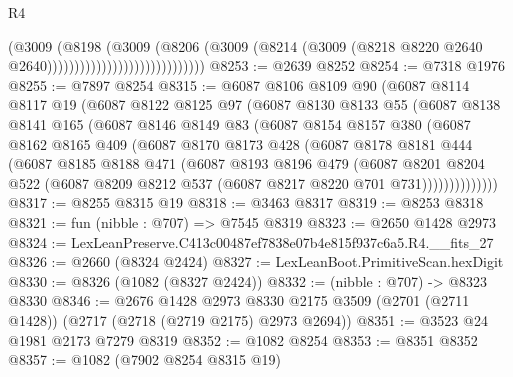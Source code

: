 \begin{lexlean}{R4}
\begin{coremodule}
                                              (@3009
                                                (@8198
                                                  (@3009
                                                    (@8206
                                                      (@3009
                                                        (@8214
                                                          (@3009
                                                            (@8218
                                                              @8220
                                                              @2640
                                                              @2640)))))))))))))))))))))))))))))
@8253 := @2639 @8252
@8254 := @7318 @1976
@8255 := @7897 @8254
@8315 := @6087
    @8106
    @8109
    @90
    (@6087
      @8114
      @8117
      @19
      (@6087
        @8122
        @8125
        @97
        (@6087
          @8130
          @8133
          @55
          (@6087
            @8138
            @8141
            @165
            (@6087
              @8146
              @8149
              @83
              (@6087
                @8154
                @8157
                @380
                (@6087
                  @8162
                  @8165
                  @409
                  (@6087
                    @8170
                    @8173
                    @428
                    (@6087
                      @8178
                      @8181
                      @444
                      (@6087
                        @8185
                        @8188
                        @471
                        (@6087
                          @8193
                          @8196
                          @479
                          (@6087
                            @8201
                            @8204
                            @522
                            (@6087 @8209 @8212 @537 (@6087 @8217 @8220 @701 @731))))))))))))))
@8317 := @8255 @8315 @19
@8318 := @3463 @8317
@8319 := @8253 @8318
@8321 := fun (nibble : @707) => @7545 @8319
@8323 := @2650 @1428 @2973
@8324 := LexLeanPreserve.C413c00487ef7838e07b4e815f937c6a5.R4.__fits_27
@8326 := @2660 (@8324 @2424)
@8327 := LexLeanBoot.PrimitiveScan.hexDigit
@8330 := @8326 (@1082 (@8327 @2424))
@8332 := (nibble : @707) -> @8323 @8330
@8346 := @2676
    @1428
    @2973
    @8330
    @2175
    @3509
    (@2701 (@2711 @1428))
    (@2717 (@2718 (@2719 @2175) @2973 @2694))
@8351 := @3523 @24 @1981 @2173 @7279 @8319
@8352 := @1082 @8254
@8353 := @8351 @8352
@8357 := @1082 (@7902 @8254 @8315 @19)

\end{coremodule}
\end{lexlean}
